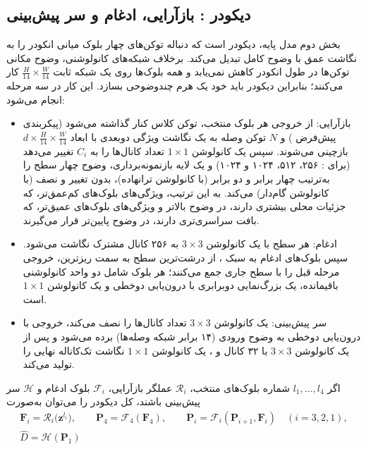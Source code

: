 \subsection[دیکودر \lr{DPT}: بازآرایی، ادغام و سر پیش‌بینی]{دیکودر {}: بازآرایی، ادغام و سر پیش‌بینی}
بخش دوم مدل پایه، دیکودر  است که دنباله توکن‌های چهار بلوک میانی انکودر را به نگاشت عمق با وضوح کامل تبدیل می‌کند. برخلاف شبکه‌های کانولوشنی، وضوح مکانی توکن‌ها در طول انکودر کاهش نمی‌یابد و همه بلوک‌ها روی یک شبکه ثابت $\frac{H}{14}\times\frac{W}{14}$ کار می‌کنند؛ بنابراین دیکودر باید خود یک هرم چندوضوحی بسازد. این کار در سه مرحله انجام می‌شود:
\begin{itemize}
 \item بازآرایی: از خروجی هر بلوک منتخب، توکن کلاس کنار گذاشته می‌شود (پیکربندی پیش‌فرض ) و $N$ توکن وصله به یک نگاشت ویژگی دوبعدی با ابعاد $d\times\frac{H}{14}\times\frac{W}{14}$ بازچینی می‌شوند. سپس یک کانولوشن $1\times1$ تعداد کانال‌ها را به $C_i$ تغییر می‌دهد (برای : ۲۵۶، ۵۱۲، ۱۰۲۴ و ۱۰۲۴) و یک لایه بازنمونه‌برداری، وضوح چهار سطح را به‌ترتیب چهار برابر و دو برابر (با کانولوشن ترانهاده)، بدون تغییر و نصف (با کانولوشن گام‌دار) می‌کند. به این ترتیب، ویژگی‌های بلوک‌های کم‌عمق‌تر، که جزئیات محلی بیشتری دارند، در وضوح بالاتر و ویژگی‌های بلوک‌های عمیق‌تر، که بافت سراسری‌تری دارند، در وضوح پایین‌تر قرار می‌گیرند.
 \item ادغام: هر سطح با یک کانولوشن $3\times3$ به ۲۵۶ کانال مشترک نگاشت می‌شود. سپس بلوک‌های ادغام به سبک ، از درشت‌ترین سطح به سمت ریزترین، خروجی مرحله قبل را با سطح جاری جمع می‌کنند؛ هر بلوک شامل دو واحد کانولوشنی باقیمانده، یک بزرگ‌نمایی دوبرابری با درون‌یابی دوخطی و یک کانولوشن $1\times1$ است.
 \item سر پیش‌بینی: یک کانولوشن $3\times3$ تعداد کانال‌ها را نصف می‌کند، خروجی با درون‌یابی دوخطی به وضوح ورودی (۱۴ برابر شبکه وصله‌ها) برده می‌شود و پس از یک کانولوشن $3\times3$ با ۳۲ کانال و ، یک کانولوشن $1\times1$ نگاشت تک‌کاناله نهایی را تولید می‌کند.
\end{itemize}
اگر $l_1,\dots,l_4$ شماره بلوک‌های منتخب، $\mathcal{R}_i$ عملگر بازآرایی، $\mathcal{F}_i$ بلوک ادغام و $\mathcal{H}$ سر پیش‌بینی باشند، کل دیکودر را می‌توان به‌صورت
\begin{equation}
\begin{gathered}
 \mathbf{F}_i=\mathcal{R}_i\bigl(\mathbf{z}^{l_i}\bigr),\qquad
 \mathbf{P}_4=\mathcal{F}_4(\mathbf{F}_4),\qquad
 \mathbf{P}_i=\mathcal{F}_i(\mathbf{P}_{i+1},\mathbf{F}_i)\quad (i=3,2,1),\\
 \hat D=\mathcal{H}(\mathbf{P}_1)
\end{gathered}
\end{equation}
